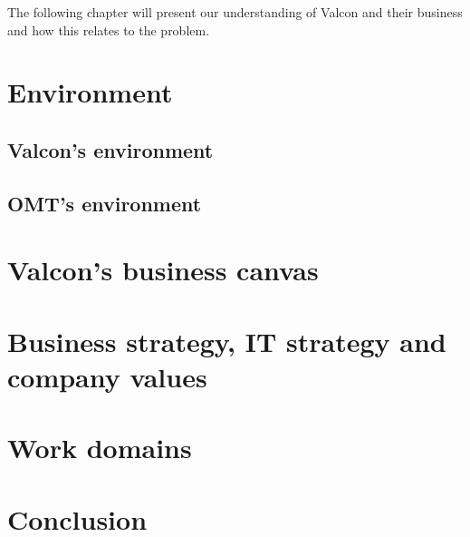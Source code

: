 The following chapter will present our understanding of Valcon and their business and how this relates to the problem. 

\section{Environment}
 
\subsection{Valcon's environment}

\subsection{OMT's environment}

\section{Valcon's business canvas}

\section{Business strategy, IT strategy and company values}

\section{Work domains}

\section{Conclusion}
